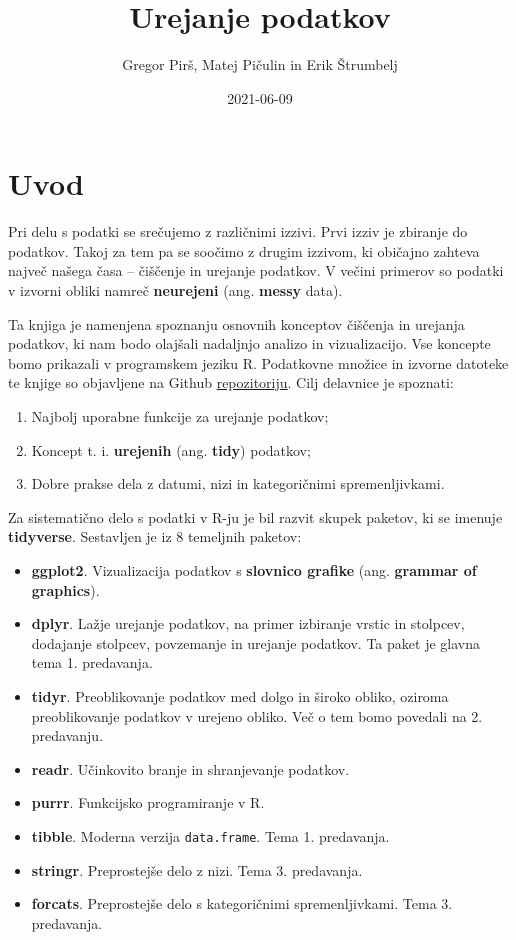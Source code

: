\documentclass[
]{book}
\title{Urejanje podatkov}
\author{Gregor Pirš, Matej Pičulin in Erik Štrumbelj}
\date{2021-06-09}
\providecommand{\tightlist}{%
  \setlength{\itemsep}{0pt}\setlength{\parskip}{0pt}}
\begin{document}
\maketitle

{
\setcounter{tocdepth}{1}
\tableofcontents
}
\hypertarget{uvod}{%
\chapter*{Uvod}\label{uvod}}

Pri delu s podatki se srečujemo z različnimi izzivi. Prvi izziv je zbiranje do podatkov. Takoj za tem pa se soočimo z drugim izzivom, ki običajno zahteva največ našega časa -- čiščenje in urejanje podatkov. V večini primerov so podatki v izvorni obliki namreč \textbf{neurejeni} (ang. \textbf{messy} data).

Ta knjiga je namenjena spoznanju osnovnih konceptov čiščenja in urejanja podatkov, ki nam bodo olajšali nadaljnjo analizo in vizualizacijo. Vse koncepte bomo prikazali v programskem jeziku R. Podatkovne množice in izvorne datoteke te knjige so objavljene na Github \href{https://github.com/bstatcomp/urejanje-podatkov}{repozitoriju}. Cilj delavnice je spoznati:

\begin{enumerate}
\def\labelenumi{\arabic{enumi})}
\tightlist
\item
  Najbolj uporabne funkcije za urejanje podatkov;
\item
  Koncept t. i. \textbf{urejenih} (ang. \textbf{tidy}) podatkov;
\item
  Dobre prakse dela z datumi, nizi in kategoričnimi spremenljivkami.
\end{enumerate}

Za sistematično delo s podatki v R-ju je bil razvit skupek paketov, ki se imenuje \textbf{tidyverse}. Sestavljen je iz 8 temeljnih paketov:

\begin{itemize}
\tightlist
\item
  \textbf{ggplot2}. Vizualizacija podatkov s \textbf{slovnico grafike} (ang. \textbf{grammar of graphics}).
\item
  \textbf{dplyr}. Lažje urejanje podatkov, na primer izbiranje vrstic in stolpcev, dodajanje stolpcev, povzemanje in urejanje podatkov. Ta paket je glavna tema 1. predavanja.
\item
  \textbf{tidyr}. Preoblikovanje podatkov med dolgo in široko obliko, oziroma preoblikovanje podatkov v urejeno obliko. Več o tem bomo povedali na 2. predavanju.
\item
  \textbf{readr}. Učinkovito branje in shranjevanje podatkov.
\item
  \textbf{purrr}. Funkcijsko programiranje v R.
\item
  \textbf{tibble}. Moderna verzija \texttt{data.frame}. Tema 1. predavanja.
\item
  \textbf{stringr}. Preprostejše delo z nizi. Tema 3. predavanja.
\item
  \textbf{forcats}. Preprostejše delo s kategoričnimi spremenljivkami. Tema 3. predavanja.
\end{itemize}
\end{document}
